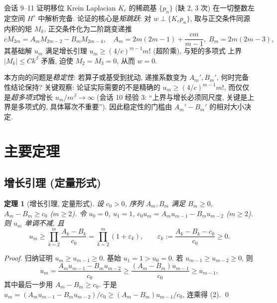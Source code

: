 \documentclass[UTF8]{ctexart}
\newtheorem{theorem}{定理}[section]
\begin{document}
会话 9--11 证明移位 Krein Laplacian $K_c$ 的稀疏基 $\{p_n\}$ (缺 2, 3 次)
在一切整数左定空间 $H^s$ 中解析完备. 论证的核心是\emph{矩跳跃}: 对
$w \perp \{K_c p_n\}$, 取与正交条件同源内积的矩 $M_k$, 正交条件化为二阶跳变递推
\begin{equation}
	c M_{2m} = A_m M_{2m-2} - B_m M_{2m-4},
	\quad A_m = 2m(2m-1)+\frac{cm}{m-1},\; B_m = 2m(2m-3),
\end{equation}
其基础解 $u_m$ 满足增长引理 $u_m \geq (4/c)^{m-1} m!$ (超阶乘), 与矩的多项式
上界 $|M_k| \leq C k^\beta$ 矛盾, 迫使 $M_2 = M_3 = 0$, 从而 $w = 0$.

本方向的问题是\emph{稳定性}: 若算子或基受到扰动, 递推系数变为
$A_m', B_m'$, 何时完备性结论保持? 关键观察: 论证实际需要的不是精确的
$u_m \geq (4/c)^{m-1}m!$, 而仅仅是\emph{超多项式}增长 $u_m/m^\beta \to \infty$
(会话 10 经验 3: ``上界与增长必须同尺度, 关键是上界是多项式的, 具体幂次不重要'').
因此稳定性的门槛由 $A_m' - B_m'$ 的相对大小决定.

\section{主要定理}

\subsection{增长引理 (定量形式)}

\begin{theorem}[增长引理, 定量形式]\label{thm:growth}
	设 $c_0 > 0$, 序列 $A_m, B_m$ 满足 $B_m \geq 0$, $A_m - B_m \geq c_0$ ($m \geq 2$).
	令 $u_0 = 0$, $u_1 = 1$, $c_0 u_m = A_m u_{m-1} - B_m u_{m-2}$ ($m \geq 2$).
	则 $u_m$ 单调不减, 且
	\begin{equation}
		u_m \geq \prod_{k=2}^{m} \frac{A_k - B_k}{c_0} = \prod_{k=2}^m (1+\varepsilon_k),
		\qquad \varepsilon_k := \frac{A_k - B_k - c_0}{c_0} \geq 0.
	\end{equation}
\end{theorem}

\begin{proof}
	归纳证明 $u_m \geq u_{m-1} \geq 0$. 基始 $u_1 = 1 > u_0 = 0$. 若
	$u_{m-1} \geq u_{m-2} \geq 0$, 则
	\[
		u_m = \frac{A_m u_{m-1} - B_m u_{m-2}}{c_0}
		\geq \frac{(A_m - B_m)u_{m-1}}{c_0} \geq u_{m-1},
	\]
	其中最后一步用 $A_m - B_m \geq c_0$. 于是
	$u_m = (A_m u_{m-1} - B_m u_{m-2})/c_0 \geq (A_m-B_m)u_{m-1}/c_0$, 连乘得 (2).
	\qed
\end{proof}
\end{document}
